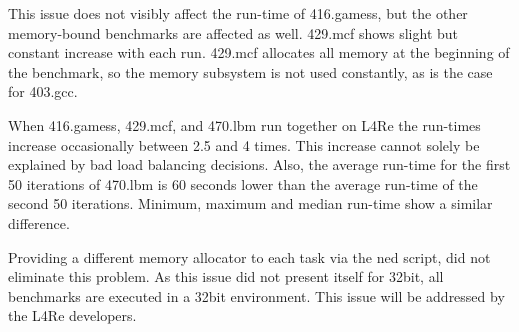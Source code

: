 This issue does not visibly affect the run-time of 416.gamess, but the other memory-bound
benchmarks are affected as well.
429.mcf shows slight but constant increase with each run.
429.mcf allocates all memory at the beginning of the benchmark, so the memory
subsystem is not used constantly, as is the case for 403.gcc.

When 416.gamess, 429.mcf, and 470.lbm run together on L4Re the run-times
increase occasionally between 2.5 and 4 times.
This increase cannot solely be explained by bad load balancing decisions.
Also, the average run-time for the first 50 iterations of 470.lbm is 60 seconds
lower than the average run-time of the second 50 iterations.
Minimum, maximum and median run-time show a similar difference.

Providing a different memory allocator to each task via the ned script,
did not eliminate this problem.
As this issue did not present itself for 32bit, all benchmarks are executed
in a 32bit environment. This issue will be addressed by the L4Re developers.


\begin{comment}
\paragraph{Benchmarks.}
SPEC progs:
solo runs: SLD, STB, MIPC, CFS
group runs: SLD, STB, MIPC, CFS
--> degradation of median compared  to solo runs

Group runs for different SMT algos: RR, load,
Group runs for different MIPC assignments: load, mpc-ipc

pingpong  clsvr group;
openmp-mmul distribution group; -- load generated by other mmul or fractal



\paragraph{Group Configuration Benchmarks}
The first is a simple \gls{ipc} ping-pong, where the server answers a call from
the client with the number of the core it is currently running on.
The client measures the time for the \gls{ipc} call and prints the answer of
the server together with its own core number and the \gls{ipc} duration.

\end{comment}
